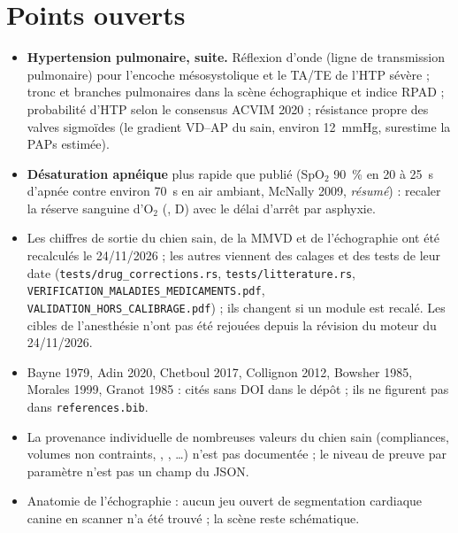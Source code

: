 \documentclass[10pt,a4paper]{article}
\newcommand{\cmd}[1]{\texttt{#1}}
\newcommand{\vp}[1]{\text{\texttt{\detokenize{#1}}}}
\newcommand{\acc}[1]{\textsl{#1}}
\begin{document}
\section*{Points ouverts}
\begin{itemize}
\item \textbf{Hypertension pulmonaire, suite.} Réflexion d'onde (ligne de transmission pulmonaire) pour l'encoche mésosystolique et le TA/TE de l'HTP sévère ; tronc et branches pulmonaires dans la scène échographique et indice RPAD ; probabilité d'HTP selon le consensus ACVIM 2020 ; résistance propre des valves sigmoïdes (le gradient VD--AP du sain, environ 12~mmHg, surestime la PAPs estimée).
\item \textbf{Désaturation apnéique} plus rapide que publié (SpO$_2$ 90~\% en 20 à 25~s d'apnée contre environ 70~s en air ambiant, McNally 2009, \acc{résumé}) : recaler la réserve sanguine d'O$_2$ (\vp{blood_o2_store_frac}, D) avec le délai d'arrêt par asphyxie.
\item Les chiffres de sortie du chien sain, de la MMVD et de l'échographie ont été recalculés le 24/11/2026 ; les autres viennent des calages et des tests de leur date (\cmd{tests/drug\_corrections.rs}, \cmd{tests/litterature.rs}, \cmd{VERIFICATION\_MALADIES\_MEDICAMENTS.pdf}, \cmd{VALIDATION\_HORS\_CALIBRAGE.pdf}) ; ils changent si un module est recalé. Les cibles de l'anesthésie n'ont pas été rejouées depuis la révision du moteur du 24/11/2026.
\item Bayne 1979, Adin 2020, Chetboul 2017, Collignon 2012, Bowsher 1985, Morales 1999, Granot 1985 : cités sans DOI dans le dépôt ; ils ne figurent pas dans \cmd{references.bib}.
\item La provenance individuelle de nombreuses valeurs du chien sain (compliances, volumes non contraints, \vp{hb}, \vp{gfr0}, \vp{creat0}\ldots) n'est pas documentée ; le niveau de preuve par paramètre n'est pas un champ du JSON.
\item Anatomie de l'échographie : aucun jeu ouvert de segmentation cardiaque canine en scanner n'a été trouvé ; la scène reste schématique.
\end{itemize}
\end{document}
